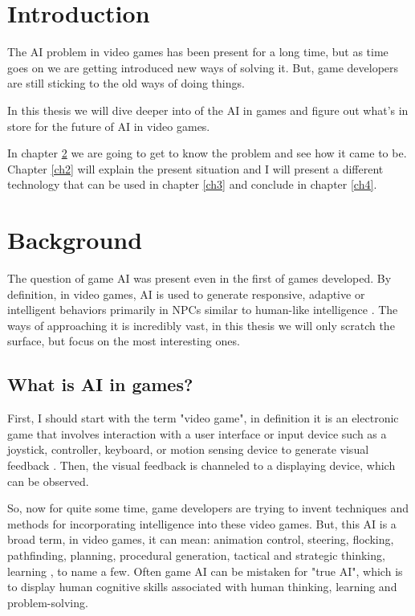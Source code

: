 \documentclass[a4paper, 12pt]{book}
\begin{document}

\mainmatter
\setcounter{page}{1}
\pagestyle{fancy}


\chapter{Introduction}

The AI problem in video games has been present for a long time, but as time goes on we are getting introduced new ways of solving it. But, game developers are still sticking to the old ways of doing things. %

In this thesis we will dive deeper into of the AI in games and figure out what's in store for the future of AI in video games.

In chapter \ref{ch1} we are going to get to know the problem and see how it came to be.
Chapter \ref{ch2} will explain the present situation and I will present a different technology that can be used in chapter \ref{ch3} and conclude in chapter \ref{ch4}.


\chapter{Background}
\label{ch1}
The question of game AI was present even in the first of games developed. By definition, in video games, AI is used to generate responsive, adaptive or intelligent behaviors primarily in NPCs similar to human-like intelligence \cite{AIwiki}. The ways of approaching it is incredibly vast, in this thesis we will only scratch the surface, but focus on the most interesting ones.

\section{What is AI in games?}
First, I should start with the term "video game", in definition it is an electronic game that involves interaction with a user interface or input device such as a joystick, controller, keyboard, or motion sensing device to generate visual feedback \cite{VideoGameWiki}. Then, the visual feedback is channeled to a displaying device, which can be observed. 

So, now for quite some time, game developers are trying to invent techniques and methods for incorporating intelligence into these video games. But, this AI is a broad term, in video games, it can mean: animation control, steering, flocking, pathfinding, planning, procedural generation, tactical and strategic thinking, learning \cite{FuzzyAIGames}, to name a few. Often game AI can be mistaken for "true AI", which is to display human cognitive skills associated with human thinking, learning and problem-solving.
\end{document}
